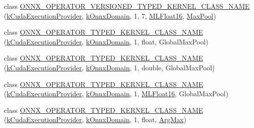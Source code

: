 \begin{DoxyCompactItemize}
\item 
class \mbox{\hyperlink{namespaceonnxruntime_1_1cuda_a276fc2e6fdbcb0c26c0c2c1877d71c01}{O\+N\+N\+X\+\_\+\+O\+P\+E\+R\+A\+T\+O\+R\+\_\+\+V\+E\+R\+S\+I\+O\+N\+E\+D\+\_\+\+T\+Y\+P\+E\+D\+\_\+\+K\+E\+R\+N\+E\+L\+\_\+\+C\+L\+A\+S\+S\+\_\+\+N\+A\+ME}} (\mbox{\hyperlink{namespaceonnxruntime_a73ebc64887ddd1968e3cef47ffefe35b}{k\+Cuda\+Execution\+Provider}}, \mbox{\hyperlink{namespaceonnxruntime_ac0e7c0c106a2c9e9594560a3ab289fa0}{k\+Onnx\+Domain}}, 1, 7, \mbox{\hyperlink{uniononnxruntime_1_1MLFloat16}{M\+L\+Float16}}, \mbox{\hyperlink{classonnxruntime_1_1MaxPool}{Max\+Pool}})
\item 
class \mbox{\hyperlink{namespaceonnxruntime_1_1cuda_a8c1c177c8c2d54010908e8c4be664201}{O\+N\+N\+X\+\_\+\+O\+P\+E\+R\+A\+T\+O\+R\+\_\+\+T\+Y\+P\+E\+D\+\_\+\+K\+E\+R\+N\+E\+L\+\_\+\+C\+L\+A\+S\+S\+\_\+\+N\+A\+ME}} (\mbox{\hyperlink{namespaceonnxruntime_a73ebc64887ddd1968e3cef47ffefe35b}{k\+Cuda\+Execution\+Provider}}, \mbox{\hyperlink{namespaceonnxruntime_ac0e7c0c106a2c9e9594560a3ab289fa0}{k\+Onnx\+Domain}}, 1, float, Global\+Max\+Pool)
\item 
class \mbox{\hyperlink{namespaceonnxruntime_1_1cuda_a652057dc5443428b5ed60a643ca50fda}{O\+N\+N\+X\+\_\+\+O\+P\+E\+R\+A\+T\+O\+R\+\_\+\+T\+Y\+P\+E\+D\+\_\+\+K\+E\+R\+N\+E\+L\+\_\+\+C\+L\+A\+S\+S\+\_\+\+N\+A\+ME}} (\mbox{\hyperlink{namespaceonnxruntime_a73ebc64887ddd1968e3cef47ffefe35b}{k\+Cuda\+Execution\+Provider}}, \mbox{\hyperlink{namespaceonnxruntime_ac0e7c0c106a2c9e9594560a3ab289fa0}{k\+Onnx\+Domain}}, 1, double, Global\+Max\+Pool)
\item 
class \mbox{\hyperlink{namespaceonnxruntime_1_1cuda_ae6a4393257054602b9622801359275fb}{O\+N\+N\+X\+\_\+\+O\+P\+E\+R\+A\+T\+O\+R\+\_\+\+T\+Y\+P\+E\+D\+\_\+\+K\+E\+R\+N\+E\+L\+\_\+\+C\+L\+A\+S\+S\+\_\+\+N\+A\+ME}} (\mbox{\hyperlink{namespaceonnxruntime_a73ebc64887ddd1968e3cef47ffefe35b}{k\+Cuda\+Execution\+Provider}}, \mbox{\hyperlink{namespaceonnxruntime_ac0e7c0c106a2c9e9594560a3ab289fa0}{k\+Onnx\+Domain}}, 1, \mbox{\hyperlink{uniononnxruntime_1_1MLFloat16}{M\+L\+Float16}}, Global\+Max\+Pool)
\item 
class \mbox{\hyperlink{namespaceonnxruntime_1_1cuda_a2b1e22f9c0d6662ac8fa00ede464b5b1}{O\+N\+N\+X\+\_\+\+O\+P\+E\+R\+A\+T\+O\+R\+\_\+\+T\+Y\+P\+E\+D\+\_\+\+K\+E\+R\+N\+E\+L\+\_\+\+C\+L\+A\+S\+S\+\_\+\+N\+A\+ME}} (\mbox{\hyperlink{namespaceonnxruntime_a73ebc64887ddd1968e3cef47ffefe35b}{k\+Cuda\+Execution\+Provider}}, \mbox{\hyperlink{namespaceonnxruntime_ac0e7c0c106a2c9e9594560a3ab289fa0}{k\+Onnx\+Domain}}, 1, float, \mbox{\hyperlink{classonnxruntime_1_1cuda_1_1ArgMax}{Arg\+Max}})

\end{DoxyCompactItemize}

